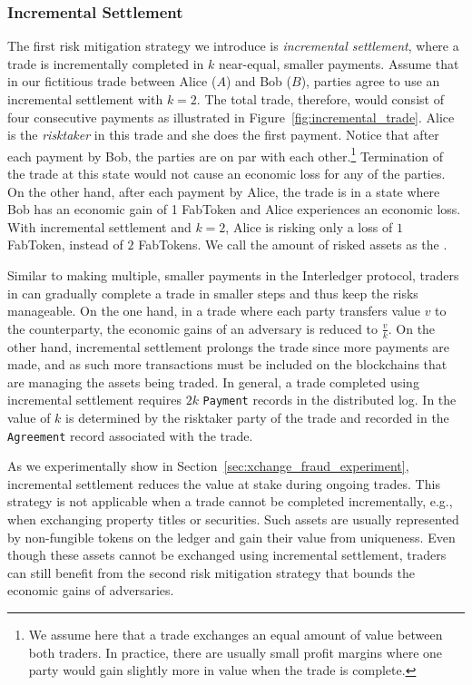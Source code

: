 \subsubsection{Incremental Settlement}
\label{sec:incremental_settlement}
The first risk mitigation strategy we introduce is \emph{incremental settlement}, where a trade is incrementally completed in $ k $ near-equal, smaller payments.
Assume that in our fictitious trade between Alice ($ A $) and Bob ($ B $), parties agree to use an incremental settlement with $ k = 2$.
The total trade, therefore, would consist of four consecutive payments as illustrated in Figure~\ref{fig:incremental_trade}. 
Alice is the \emph{risktaker} in this trade and she does the first payment.
Notice that after each payment by Bob, the parties are on par with each other.\footnote{We assume here that a trade exchanges an equal amount of value between both traders. In practice, there are usually small profit margins where one party would gain slightly more in value when the trade is complete.} 
Termination of the trade at this state would not cause an economic loss for any of the parties.
On the other hand, after each payment by Alice, the trade is in a state where Bob has an economic gain of 1 FabToken and Alice experiences an economic loss.
With incremental settlement and $ k = 2 $, Alice is risking only a loss of $ 1 $ FabToken, instead of $ 2 $ FabTokens.
We call the amount of risked assets as the \MarginalStake{}.

Similar to making multiple, smaller payments in the Interledger protocol, traders in \ModelName{} can gradually complete a trade in smaller steps and thus keep the risks manageable.
On the one hand, in a trade where each party transfers value $ v $ to the counterparty, the economic gains of an adversary is reduced to $ \frac{v}{k} $.
On the other hand, incremental settlement prolongs the trade since more payments are made, and as such more transactions must be included on the blockchains that are managing the assets being traded.
In general, a trade completed using incremental settlement requires $ 2k $ \texttt{Payment} records in the distributed log.
In \ModelName{} the value of $ k $ is determined by the risktaker party of the trade and recorded in the \texttt{Agreement} record associated with the trade.

As we experimentally show in Section~\ref{sec:xchange_fraud_experiment}, incremental settlement reduces the value at stake during ongoing trades.
This strategy is not applicable when a trade cannot be completed incrementally, e.g., when exchanging property titles or securities.
Such assets are usually represented by non-fungible tokens on the ledger and gain their value from uniqueness.
Even though these assets cannot be exchanged using incremental settlement, traders can still benefit from the second risk mitigation strategy that bounds the economic gains of adversaries.


